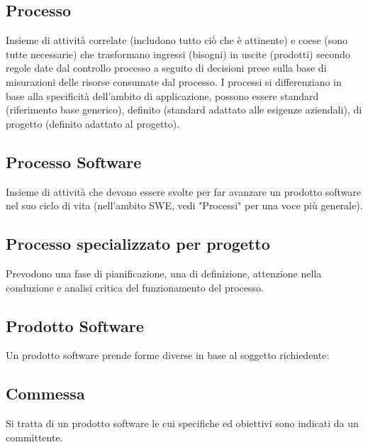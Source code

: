 	\subsection{Processo}	
	\label{sec:processi}
	Insieme di attività correlate (includono tutto ciò che è attinente) e coese (sono tutte necessarie) che trasformano ingressi (bisogni) in uscite (prodotti) secondo regole date dal controllo processo a seguito di decisioni prese sulla base di misurazioni delle risorse consumate dal processo.
	I processi si differenziano in base alla specificità dell'ambito di applicazione, possono essere standard (riferimento base generico), definito (standard adattato alle esigenze aziendali), di progetto (definito adattato al progetto).
	
	\subsection{Processo Software}
	\label{sec:processisoftware}
Insieme di attività che devono essere svolte per far avanzare un prodotto software nel suo ciclo di vita (nell'ambito SWE, vedi "Processi" per una voce più generale).

	\subsection{Processo specializzato per progetto}
	\label{sec:processispecializzati}
	Prevodono una fase di pianificazione, una di definizione, attenzione nella conduzione e analisi critica del funzionamento del processo.
	
	\subsection{Prodotto Software}
	\label{sec:prodottosoftware}
	Un prodotto software prende forme diverse in base al soggetto richiedente:
		
		\subsection{Commessa}
		Si tratta di un prodotto software le cui specifiche ed obiettivi sono indicati da un committente.
	
